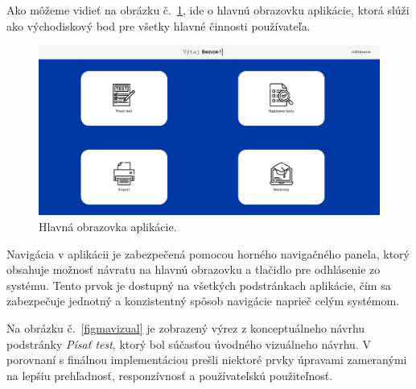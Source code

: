 Ako môžeme vidieť na obrázku č.~\ref{homescreen}, ide o hlavnú obrazovku aplikácie, ktorá slúži ako východiskový bod pre všetky hlavné činnosti používateľa.

\begin{figure}[h!]
  \centering
  \includegraphics[width=16cm]{img/homepage.png}
  \caption{Hlavná obrazovka aplikácie.}
  \label{homescreen}
\end{figure} 

Navigácia v aplikácii je zabezpečená pomocou horného navigačného panela, ktorý obsahuje možnosť návratu na hlavnú obrazovku a tlačidlo pre odhlásenie zo systému. Tento prvok je dostupný na všetkých podstránkach aplikácie, čím sa zabezpečuje jednotný a konzistentný spôsob navigácie naprieč celým systémom.

Na obrázku č.~\ref{figmavizual} je zobrazený výrez z konceptuálneho návrhu podstránky \textit{Písať test}, ktorý bol súčasťou úvodného vizuálneho návrhu. V porovnaní s finálnou implementáciou prešli niektoré prvky úpravami zameranými na lepšiu prehľadnosť, responzívnosť a používateľskú použiteľnosť.

